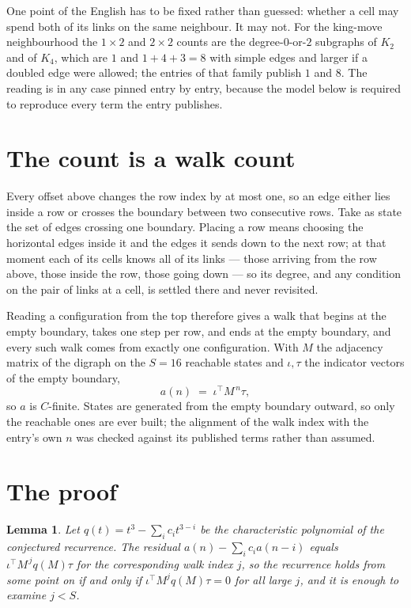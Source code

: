 \documentclass[11pt,a4paper]{article}
\theoremstyle{plain}
\newtheorem{lemma}[theorem]{Lemma}
\theoremstyle{definition}
\begin{document}
One point of the English has to be fixed rather than guessed: whether a cell may spend both of
its links on the same neighbour. It may not. For the king-move neighbourhood the $1\times2$
and $2\times2$ counts are the degree-$0$-or-$2$ subgraphs of $K_2$ and of $K_4$, which are $1$
and $1+4+3=8$ with simple edges and larger if a doubled edge were allowed; the entries of that
family publish $1$ and $8$. The reading is in any case pinned entry by entry, because the
model below is required to reproduce every term the entry publishes.


\section{The count is a walk count}

Every offset above changes the row index by at most one, so an edge either lies inside a row
or crosses the boundary between two consecutive rows. Take as state the set of edges crossing
one boundary. Placing a row means choosing the horizontal edges inside it and the edges it
sends down to the next row; at that moment each of its cells knows all of its links --- those
arriving from the row above, those inside the row, those going down --- so its degree, and any
condition on the pair of links at a cell, is settled there and never revisited.

Reading a configuration from the top therefore gives a walk that begins at the empty boundary,
takes one step per row, and ends at the empty boundary, and every such walk comes from exactly
one configuration. With $M$ the adjacency matrix of the digraph on the $S=16$ reachable
states and $\iota,\tau$ the indicator vectors of the empty boundary,
\[
a(n)\;=\;\iota^{\!\top}M^{\,n}\tau ,
\]
so $a$ is $C$-finite. States are generated from the empty boundary outward, so only the
reachable ones are ever built; the alignment of the walk index with the entry's own $n$ was
checked against its published terms rather than assumed.

\section{The proof}

\begin{lemma}\label{lem:crit}
Let $q(t)=t^{3}-\sum_i c_it^{3-i}$ be the characteristic polynomial of the
conjectured recurrence. The residual $a(n)-\sum_ic_ia(n-i)$ equals
$\iota^{\!\top}M^{\,j}q(M)\tau$ for the corresponding walk index $j$, so the recurrence
holds from some point on if and only if $\iota^{\!\top}M^{j}q(M)\tau=0$ for all large $j$,
and it is enough to examine $j<S$.
\end{lemma}
\end{document}
